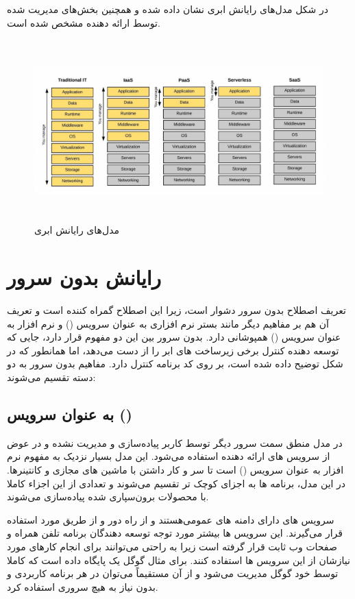 در شکل مدل‌های رایانش ابری نشان داده شده و همچنین بخش‌های مدیریت شده توسط ارائه دهنده مشخص شده‌ است.

\begin{figure}[!h]
	\centering
	\includegraphics[height=7cm]{images/cloud-computing-service-models}
	\caption{مدل‌های رایانش ابری}
	\label{تصویر 2-1}
\end{figure}

\newpage

\section{رایانش بدون سرور}

تعریف اصطلاح بدون سرور دشوار است، زیرا این اصطلاح گمراه کننده است و تعریف آن هم بر مفاهیم دیگر مانند بستر نرم افزاری به عنوان سرویس () و نرم افزار به عنوان سرویس () همپوشانی دارد. بدون سرور بین این دو مفهوم قرار دارد، جایی که توسعه دهنده کنترل برخی زیرساخت های ابر را از دست می‌دهد، اما همانطور که در شکل  توضیح داده شده است، بر روی کد برنامه کنترل دارد. مفاهیم بدون سرور به دو دسته تقسیم می‌شوند:

\subsection{ به عنوان سرویس ()}

در مدل  منطق سمت سرور دیگر توسط کاربر پیاده‌سازی و مدیریت نشده و در عوض از سرویس های ارائه دهنده استفاده می‌شود. این مدل بسیار نزدیک به مفهوم نرم افزار به عنوان سرویس () است تا سر و کار داشتن با ماشین های مجازی و کانتینرها. در این مدل، برنامه ها به اجزای کوچک تر تقسیم می‌شوند و تعدادی از این اجزاء کاملا با محصولات برون‌سپاری شده پیاده‌سازی می‌شوند.

سرویس های  دارای دامنه های عمومی‌هستند و از راه دور و از طریق  مورد استفاده قرار می‌گیرند. این سرویس ها بیشتر مورد توجه توسعه دهندگان برنامه تلفن همراه و صفحات وب ثابت قرار گرفته است زیرا به راحتی می‌توانند برای انجام کارهای مورد نیازشان از این سرویس ها استفاده کنند. برای مثال  گوگل یک پایگاه داده است که کاملا توسط خود گوگل مدیریت می‌شود و از آن مستقیماً می‌توان در هر برنامه کاربردی و بدون نیاز به هیچ سروری استفاده کرد.

